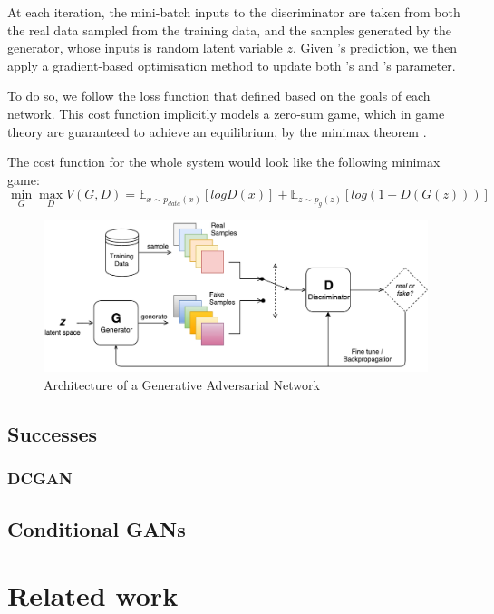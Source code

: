 At each iteration, the mini-batch inputs to the discriminator  are taken from both the real data sampled from the training data, and the samples generated by the generator, whose inputs is random latent variable $z$. Given 's prediction, we then apply a gradient-based optimisation method to update both 's and 's parameter.

To do so, we follow the loss function that defined based on the goals of each network. This cost function implicitly models a zero-sum game, which in game theory are guaranteed to achieve an equilibrium, by the minimax theorem \citep{du2013minimax}.

The cost function for the whole system would look like the following minimax game:
\[\min_{G} \max_{D} V(G, D) = \mathbb{E}_{x\sim p_{data}(x)}[log D(x)] + \mathbb{E}_{z \sim p_{g}(z)}[log(1-D(G(z)))] \]

\begin{figure}
\centering
\includegraphics[width=15cm]{Figures/VanillaGAN}
\caption{Architecture of a Generative Adversarial Network}
\label{fig:VanillaGAN}
\end{figure}

\subsection{Successes}
\label{successes}
\subsubsection{DCGAN}

\subsection{Conditional GANs}


\section{Related work}
